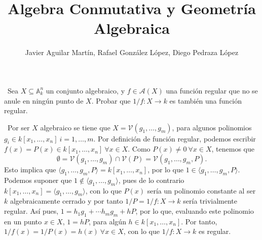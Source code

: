 \documentclass[twoside]{article}
\begin{document}
\title{Algebra Conmutativa y Geometría Algebraica}
\author{Javier Aguilar Martín, Rafael González López, Diego Pedraza López}
\maketitle

\begin{ejercicio}{2}\
Sea $X \subseteq \mathbb{A}^n_k$
un conjunto algebraico, y $f \in \mathcal{A}(X)$ una función
regular que no se anule en ningún punto de $X$. Probar que $1/f : X \to k$ es
también una función regular.
\end{ejercicio}
\begin{solucion}\
Por ser $X$ algebraico se tiene que $X=\mathcal{V}(g_1,\dots,g_m)$, para algunos polinomios $g_i\in k[x_1,\dots,x_n]\ i=1,\dots,m$. Por definición de función regular, podemos escribir $f(x)=P(x)\in k[x_1,\dots, x_n]\ \forall x\in X$. Como $P(x)\neq 0\ \forall x\in X$, tenemos que 
$$\emptyset=\mathcal{V}(g_1,\dots,g_m)\cap\mathcal{V}(P)=\mathcal{V}(g_1,\dots,g_m,P).$$
Esto implica que $\langle g_1,\dots,g_m,P\rangle=k[x_1,\dots, x_n]$, por lo que $1\in \langle g_1,\dots,g_m,P\rangle$. Podemos suponer que $1\notin \langle g_1,\dots,g_m\rangle$, pues de lo contrario $k[x_1,\dots, x_n]=\langle g_1,\dots,g_m\rangle$, con lo que $P(x)$ sería un polinomio constante al ser $k$ algebraicamente cerrado y por tanto $1/P=1/f:X\to k$ sería trivialmente regular. Así pues, $1= h_1g_1+\cdots h_mg_m+hP$, por lo que, evaluando este polinomio en un punto $x\in X$, $1=hP$, para algún $h\in k[x_1,\dots, x_n]$. Por tanto, $1/f(x)=1/P(x)=h(x)\ \forall x\in X$, con lo que $1/f:X\to k$ es regular. 


\end{solucion}

\newpage
\end{document}
